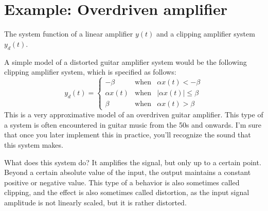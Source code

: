 \section{Example: Overdriven amplifier}
\begin{marginfigure}
\caption{The system function of a linear amplifier $y(t)$ and a clipping amplifier system $y_d(t)$.}
\label{dist_effect}
\end{marginfigure}

A simple model of a distorted guitar amplifier system would be the
following clipping amplifier system, which is specified as follows:
\begin{equation}
y_d(t) = \left\{
  \begin{array}{rcr}
    -\beta & \mathrm{when} & \alpha x(t)<-\beta \\
    \alpha x(t) & \mathrm{when} & |\alpha x(t)| \le \beta \\
    \beta & \mathrm{when} & \alpha x(t)>\beta 
\end{array}
\right.
\label{clipamp}
\end{equation}
This is a very approximative model of an overdriven guitar
amplifier. This type of a system is often encountered in guitar music from the 50s and onwards. I'm sure that once you later implement this in practice, you'll recognize the sound that this system makes.

What does this system do? It amplifies the signal, but only up to a certain point. Beyond a certain absolute value of the input, the output maintains a constant positive or negative value.  This type of a behavior is also sometimes called clipping, and the effect is
also sometimes called distortion, as the input signal amplitude is not linearly scaled, but it is rather distorted.

